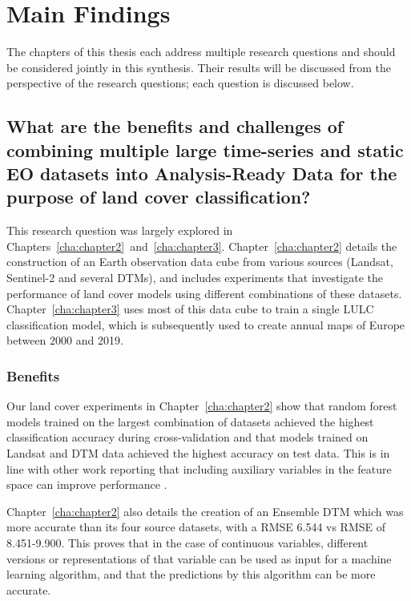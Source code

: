 \section{Main Findings}
    The chapters of this thesis each address multiple research questions and should be considered jointly in this synthesis. Their results will be discussed from the perspective of the research questions; each question is discussed below.
    
    \subsection{What are the benefits and challenges of combining multiple large time-series and static EO datasets into Analysis-Ready Data for the purpose of land cover classification?}
    \label{syn:rq1}

        This research question was largely explored in Chapters\@~\ref{cha:chapter2}\@~and\@~\ref{cha:chapter3}. Chapter\@~\ref{cha:chapter2} details the construction of an Earth observation data cube from various sources (Landsat, Sentinel-2 and several DTMs), and includes experiments that investigate the performance of land cover models using different combinations of these datasets. Chapter\@~\ref{cha:chapter3} uses most of this data cube to train a single LULC classification model, which is subsequently used to create annual maps of Europe between 2000 and 2019. 

        \subsubsection{Benefits}
    
            Our land cover experiments in Chapter\@~\ref{cha:chapter2} show that random forest models trained on the largest combination of datasets achieved the highest classification accuracy during cross-validation and that models trained on Landsat and DTM data achieved the highest accuracy on test data. This is in line with other work reporting that including auxiliary variables in the feature space can improve performance \citep{zhu2016optimizing, hurskainen2019auxiliary, hosseiny2022urban, santos2012multiscale}.

            Chapter\@~\ref{cha:chapter2} also details the creation of an Ensemble DTM which was more accurate than its four source datasets, with a RMSE 6.544 vs RMSE of 8.451-9.900. This proves that in the case of continuous variables, different versions or representations of that variable can be used as input for a machine learning algorithm, and that the predictions by this algorithm can be more accurate.
            
